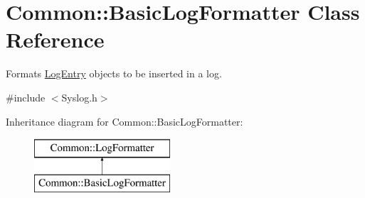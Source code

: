 \hypertarget{class_common_1_1_basic_log_formatter}{\section{Common\-:\-:Basic\-Log\-Formatter Class Reference}
\label{class_common_1_1_basic_log_formatter}
}


Formats \hyperlink{class_common_1_1_log_entry}{Log\-Entry} objects to be inserted in a log.  




{\ttfamily \#include $<$Syslog.\-h$>$}

Inheritance diagram for Common\-:\-:Basic\-Log\-Formatter\-:\begin{figure}[H]
\begin{center}
\leavevmode
\includegraphics[height=2.000000cm]{class_common_1_1_basic_log_formatter}
\end{center}
\end{figure}
